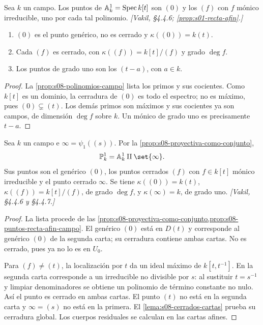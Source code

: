 \begin{prop}
\label{prop:s08-puntos-recta-afin-campo}
Sea $k$ un campo. Los puntos de $\mathbb A_k^1=\operatorname{Spec} k[t]$ son $(0)$ y los $(f)$ con $f$ mónico irreducible, uno por cada tal polinomio. \emph{[Vakil, \S4.4.6; \cref{prop:s01-recta-afin}.]}
\begin{enumerate}[label=(\alph*)]
\item $(0)$ es el punto genérico, no es cerrado y $\kappa((0))=k(t)$.
\item Cada $(f)$ es cerrado, con $\kappa((f))=k[t]/(f)$ y grado $\deg f$.
\item Los puntos de grado uno son los $(t-a)$, con $a\in k$.
\end{enumerate}
\end{prop}
\begin{proof}
La \cref{prop:s08-polinomios-campo} lista los primos y sus cocientes. Como $k[t]$ es un dominio, la cerradura de $(0)$ es todo el espectro; no es máximo, pues $(0)\subsetneq(t)$. Los demás primos son máximos y sus cocientes ya son campos, de dimensión $\deg f$ sobre $k$. Un mónico de grado uno es precisamente $t-a$.
\end{proof}

\begin{prop}
\label{prop:s08-puntos-proyectiva-cuerpo}
\label{ejem:s08-puntos-proyectiva-cuerpo}
Sea $k$ un campo e $\infty=\psi_1((s))$. Por la \cref{prop:s08-proyectiva-como-conjunto},
\[
\mathbb P_k^1=\mathbb A_k^1\amalg\set{\infty}.
\]
Sus puntos son el genérico $(0)$, los puntos cerrados $(f)$ con $f\in k[t]$ mónico irreducible y el punto cerrado $\infty$. Se tiene $\kappa((0))=k(t)$, $\kappa((f))=k[t]/(f)$, de grado $\deg f$, y $\kappa(\infty)=k$, de grado uno. \emph{[Vakil, \S4.4.6 y \S4.4.7.]}
\end{prop}
\begin{proof}
La lista procede de las \cref{prop:s08-proyectiva-como-conjunto,prop:s08-puntos-recta-afin-campo}. El genérico $(0)$ está en $D(t)$ y corresponde al genérico $(0)$ de la segunda carta; su cerradura contiene ambas cartas. No es cerrado, pues ya no lo es en $U_0$.

Para $(f)\ne(t)$, la localización por $t$ da un ideal máximo de $k[t,t^{-1}]$. En la segunda carta corresponde a un irreducible no divisible por $s$: al sustituir $t=s^{-1}$ y limpiar denominadores se obtiene un polinomio de término constante no nulo. Así el punto es cerrado en ambas cartas. El punto $(t)$ no está en la segunda carta y $\infty=(s)$ no está en la primera. El \cref{lema:s08-cerrados-cartas} prueba su cerradura global. Los cuerpos residuales se calculan en las cartas afines.
\end{proof}


